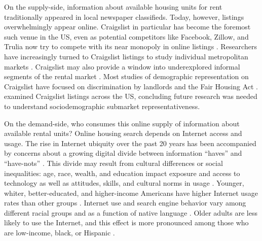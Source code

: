 \documentclass[11pt,onecolumn]{article} %
\begin{document}
On the supply-side, information about available housing units for rent traditionally appeared in local newspaper classifieds. Today, however, listings overwhelmingly appear online. Craigslist in particular has become the foremost such venue in the US, even as potential competitors like Facebook, Zillow, and Trulia now try to compete with its near monopoly in online listings \citep{hau_newspaper_2006,brown_rental_2014,seamans_responses_2014,kroft_does_2014,yurieff_facebook_2017}. Researchers have increasingly turned to Craigslist listings to study individual metropolitan markets \citep[e.g.][]{brown_converting_2017,im_energy_2017,halket_homeownership_2015,mallach_meeting_2010}. Craigslist may also provide a window into underexplored informal segments of the rental market \citep{wegmann_understanding_2012}. Most studies of demographic representation on Craigslist have focused on discrimination by landlords \citep{ahmed_can_2010,hanson_landlords_2011,hanson_field_2014,hogan_racial_2011,carlsson_discrimination_2014} and the Fair Housing Act \citep[e.g.][]{larkin_criminal_2010,oliveri_discriminatory_2010,wilemon_fair_2009,ross_cyberspace:_2009}. \citet{boeing_new_2017} examined Craigslist listings across the US, concluding future research was needed to understand sociodemographic submarket representativeness.

On the demand-side, who consumes this online supply of information about available rental units? Online housing search depends on Internet access and usage. The rise in Internet ubiquity over the past 20 years has been accompanied by concerns about a growing digital divide between information \enquote{haves} and \enquote{have-nots} \citep{hersberger_are_2003}. This divide may result from cultural differences or social inequalities: age, race, wealth, and education impact exposure and access to technology as well as attitudes, skills, and cultural norms in usage \citep{jones_u.s._2009,robinson_digital_2015}. Younger, whiter, better-educated, and higher-income Americans have higher Internet usage rates than other groups \citep{porter_using_2006}. Internet use and search engine behavior vary among different racial groups and as a function of native language \citep{slate_digital_2002,weber_who_2011}. Older adults are less likely to use the Internet, and this effect is more pronounced among those who are low-income, black, or Hispanic \citep{choi_digital_2013}.
\end{document}
